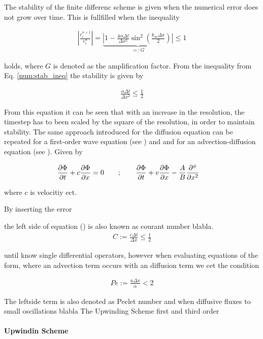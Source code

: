 The stability of the finite differenc scheme is given when the numerical error does not grow over time. This is fullfilled when the inequality

\begin{align}
    \label{num:stab_ineq}
    \left|\frac{\epsilon_i^{n+1}}{\epsilon_i^n}\right| =
    \underbrace{\left|1 -  \frac{4\alpha \Delta t}{\Delta x^2} \sin^2\left(\frac{k_m \Delta x}{2}\right)\right|}_{=:G} \leq 1
\end{align}

holds, where $G$ is denoted as the amplification factor. From the inequality from Eq. \ref{num:stab_ineq}
the stability is given by

\begin{align}
   \frac{\alpha \Delta t}{\Delta x^2} \leq \frac{1}{2}
\end{align}

From this equation it can be seen that with an increase in the resolution, the timestep has to been scaled by the square of the resolution, in order to
maintain stability. The same approach introduced for the diffusion equation can be repeated for a first-order wave equation (see \citep{janderson}) and
and for an advection-diffusion equation (see \citep{ferziger99}). Given by

\begin{align}
    \pdn[\Phi]{t} + c \pdn[\Phi]{x} = 0 \qquad &; \qquad  \pdn[\Phi]{t} + v \pdn[\Phi]{x}  - \frac{A}{B}\pdn[^\phi]{x^2}
\end{align}

where $c$ is velocitiy ect.

By inserting the error

the left side of equation () is also known as courant number blabla.
\begin{align}
    C := \frac{c \Delta t}{\Delta x} \leq \frac{1}{2}
\end{align}

until know single differential operators, however when evaluating equations of the form, where an advection term occurs with an diffusion term
we cet the condition

\begin{align}
    Pe := \frac{u \Delta x}{\alpha} < 2
\end{align}

The leftside term is also denoted as Peclet number  and
when diffusive fluxes to small oscillations blabla
The Upwinding Scheme first and third  order

\paragraph{Upwindin Scheme}\mbox{}\\

